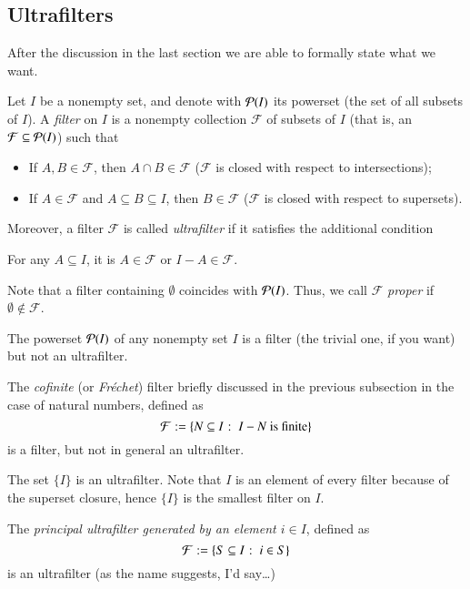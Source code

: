 \documentclass[adraft, copyright,creativecommons,sharealike,noncommercial]{Preambles/eptcs}
\begin{document}
	\subsection{Ultrafilters}
	After the discussion in the last section we are able to formally state what we want.
	\begin{definition}
		Let $I$ be a nonempty set, and denote with $\mathcal{P}(I)$ its powerset (the set of all subsets of $I$). A \emph{filter} on $I$ is a nonempty collection $\mathcal{F}$ of subsets of $I$ (that is, an $\mathcal{F} \subseteq \mathcal{P}(I)$) such that
		\begin{itemize}
			\item If $A, B \in \mathcal{F}$, then $A \cap B \in \mathcal{F}$ ($\mathcal{F}$ is closed with respect to intersections);
			
			\item If $A \in \mathcal{F}$ and $A \subseteq B \subseteq I$, then $B \in \mathcal{F}$ ($\mathcal{F}$ is closed with respect to supersets).
		\end{itemize}
	Moreover, a filter $\mathcal{F}$ is called \emph{ultrafilter} if it satisfies the additional condition
	\begin{center}
		For any $A \subseteq I$, it is $A \in \mathcal{F}$ or $I-A \in \mathcal{F}$.
	\end{center}
	Note that a filter containing $\emptyset$ coincides with $\mathcal{P}(I)$. Thus, we call $\mathcal{F}$ \emph{proper} if $\emptyset \not\in \mathcal{F}$.
	\end{definition}
\begin{example}
	The powerset $\mathcal{P}(I)$ of any nonempty set $I$ is a filter (the trivial one, if you want) but not an ultrafilter.
\end{example}
\begin{example}
	The \emph{cofinite} (or \emph{Fr\'echet}) filter briefly discussed in the previous subsection in the case of natural numbers, defined as
	\begin{equation*}
	\mathcal{F}:=\left\{N \subseteq I \: \colon \: I - N \text{ is finite}\right\}
	\end{equation*}
	is a filter, but not in general an ultrafilter.
\end{example}
\begin{example}
	The set $\{I\}$ is an ultrafilter. Note that $I$ is an element of every filter because of the superset closure, hence $\{I\}$ is the smallest filter on $I$.
\end{example}
\begin{example}
	The \emph{principal ultrafilter generated by an element $i \in I$}, defined as
	\begin{equation*}
	\mathcal{F}:=\left\{S \subseteq I \: \colon \: i \in S\right\}
	\end{equation*}
	is an ultrafilter (as the name suggests, I'd say\dots)
\end{example}
\end{document}
